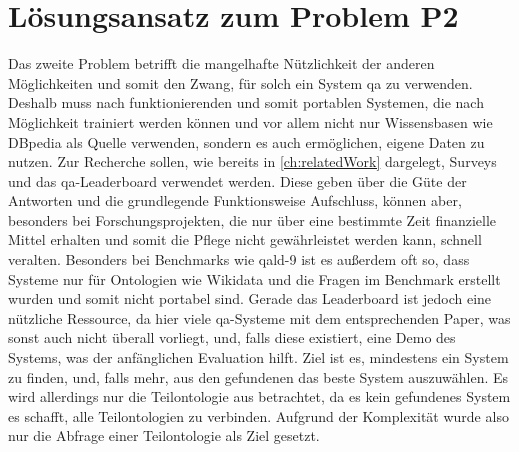 \section{Lösungsansatz zum Problem P2}

Das zweite Problem betrifft die mangelhafte Nützlichkeit der anderen Möglichkeiten und somit den Zwang, für solch ein System \acl{qa} zu verwenden.
Deshalb muss nach funktionierenden und somit portablen Systemen, die nach Möglichkeit trainiert werden können und vor allem nicht nur Wissensbasen wie DBpedia als Quelle verwenden,
sondern es auch ermöglichen, eigene Daten zu nutzen.
Zur Recherche sollen, wie bereits in \cref{ch:relatedWork} dargelegt, Surveys und das \ac{qa}-Leaderboard verwendet werden.
Diese geben über die Güte der Antworten und die grundlegende Funktionsweise Aufschluss, können aber, besonders bei Forschungsprojekten,
die nur über eine bestimmte Zeit finanzielle Mittel erhalten und somit die Pflege nicht gewährleistet werden kann, schnell veralten.
Besonders bei Benchmarks wie  \ac{qald}-9 ist es außerdem oft so, dass Systeme nur für Ontologien wie Wikidata und die Fragen im Benchmark erstellt wurden und somit nicht portabel sind.
Gerade das Leaderboard ist jedoch eine nützliche Ressource, da hier viele \ac{qa}-Systeme mit dem entsprechenden Paper, was sonst auch nicht überall vorliegt, und, falls diese existiert,
eine Demo des Systems, was der anfänglichen Evaluation hilft.
Ziel ist es, mindestens ein System zu finden, und, falls mehr, aus den gefundenen das beste System auszuwählen.
Es wird allerdings nur die Teilontologie aus \citet{bb} betrachtet, da es kein gefundenes System es schafft, alle Teilontologien zu verbinden.
Aufgrund der Komplexität wurde also nur die Abfrage einer Teilontologie als Ziel gesetzt.
